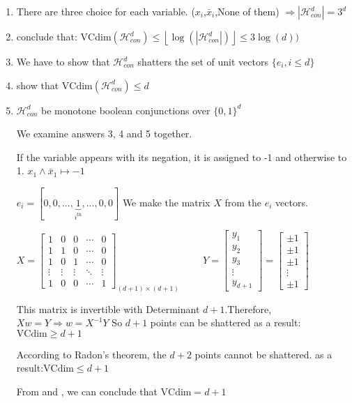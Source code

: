 \documentclass[]{book}
\begin{document}
\begin{enumerate}
    \item There are three choice for each variable. ($x_i$,$\bar{x}_i$,None of them) \hspace{1cm}$\Rightarrow |\mathcal{H}^d_{con}|=3^d$
    \item conclude that: $\text{VCdim}\left ( \mathcal{H}^d_{con} \right )\leq \left \lfloor \log\left ( \left |  \mathcal{H}^d_{con} \right | \right ) \right \rfloor\leq 3\log (d))$
    \item We have to show that $ \mathcal{H}^d_{con}$ shatters the set of unit vectors $\{e_i,i\leq d\}$
    \item show that $\text{VCdim}\left ( \mathcal{H}^d_{con} \right )\leq d$
    \item $\mathcal{H}^d_{con}$ be monotone boolean conjunctions over $\{0,1\}^d$
    
    We examine answers 3, 4 and 5 together.
    
    If the variable appears with its negation, it is assigned to -1 and otherwise to 1. $x_1 \wedge \bar{x}_1 \mapsto -1$
    
    $e_i=[0,0,...,\underset{i^\text{th}}{\underbrace{1}},...,0,0]$ We make the matrix $X$ from the $e_i$ vectors.
    
    $X=\begin{bmatrix}
1 & 0 & 0 & \cdots  &0 \\ 
1 & 1 & 0 & \cdots & 0\\ 
1 & 0 & 1 & \cdots & 0 \\ 
 \vdots& \vdots & \vdots & \ddots  &\vdots \\ 
 1& 0 & 0 & \cdots & 1
\end{bmatrix}_{(d+1)\times (d+1)}
\hspace{1cm}
Y=\begin{bmatrix}
y_1\\ 
y_2\\ 
y_3\\ 
\vdots\\ 
y_{d+1}
\end{bmatrix}=
\begin{bmatrix}
\pm 1\\ 
\pm 1\\ 
\pm 1\\ 
\vdots\\ 
\pm 1
\end{bmatrix}$

This matrix is invertible with Determinant $d+1$.Therefore,$Xw=Y\Rightarrow w=X^{-1}Y$ So $d+1$ points can be shattered as a result:
$\text{VCdim}\geq d+1$ 


According to Radon's theorem, the $d+2$ points cannot be shattered. as a result:$\text{VCdim}\leq d+1$ 

From  and , we can conclude that $\text{VCdim}= d+1$

\end{enumerate}
\end{document}
